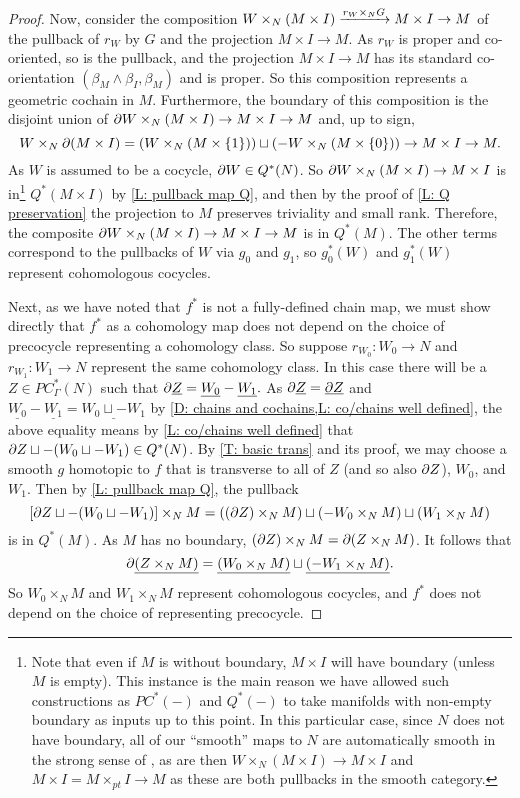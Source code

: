 \begin{proof}
	Now, consider the composition $W \times_N (M \times I) \xrightarrow{r_W \times_N G} M \times I \to M$ of the pullback of $r_W$ by $G$ and the projection $M \times I \to M$.
	As $r_W$ is proper and co-oriented, so is the pullback, and the projection $M \times I \to M$ has its standard co-orientation $(\beta_M \wedge \beta_I,\beta_M)$ and is proper.
	So this composition represents a geometric cochain in $M$.
	Furthermore, the boundary of this composition is the disjoint union of $\partial W \times_N (M \times I) \to M \times I \to M$ and, up to sign, $$W \times_N \partial(M \times I) = \left( W \times_N (M \times \{1\})\right) \sqcup \left(- W \times_N (M \times \{0\})\right) \to M \times I \to M.$$ 
	As $W$ is assumed to be a cocycle, $\partial W \in Q^*(N)$.
	So $\partial W \times_N (M \times I) \to M \times I$ is in\footnote{Note that even if $M$ is without boundary, $M \times I$ will have boundary (unless $M$ is empty).
		This instance is the main reason we have allowed such constructions as $PC^*(-)$ and $Q^*(-)$ to take manifolds with non-empty boundary as inputs up to this point.
		In this particular case, since $N$ does not have boundary, all of our ``smooth'' maps to $N$ are automatically smooth in the strong sense of \cite{Joy12}, as are then $W \times_N (M \times I) \to M \times I$ and $M \times I = M \times_{pt} I \to M$ as these are both pullbacks in the smooth category.} 
	$Q^*(M \times I)$ by \cref{L: pullback map Q}, and then by the proof of \cref{L: Q preservation} the projection to $M$ preserves triviality and small rank. 
	Therefore, the composite $\partial W \times_N (M \times I) \to M \times I \to M$ is in $Q^*(M)$. 
	The other terms correspond to the pullbacks of $W$ via $g_0$ and $g_1$, so $g_0^*(W)$ and $g_1^*(W)$ represent cohomologous cocycles.

	Next, as we have noted that $f^*$ is not a fully-defined chain map, we must show directly that $f^*$ as a cohomology map does not depend on the choice of precocycle representing a cohomology class.
	So suppose $r_{W_0} \colon W_0 \to N$ and $r_{W_1} \colon W_1 \to N$ represent the same cohomology class.
	In this case there will be a $Z \in PC^*_\Gamma(N)$ such that $\partial \underline{Z} = \underline{W_0} - \underline{W_1}.$
	As $\partial \underline{Z} = \underline{\partial Z}$ and $\underline{W_0} - \underline{W_1} = \underline{W_0 \sqcup - W_1}$ by \cref{D: chains and cochains,L: co/chains well defined}, the above equality means by \cref{L: co/chains well defined} that $\partial Z \sqcup -(W_0 \sqcup -W_1) \in Q^*(N)$. 
	By \cref{T: basic trans} and its proof, we may choose a smooth $g$ homotopic to $f$ that is transverse to all of $Z$ (and so also $\partial Z$), $W_0$, and $W_1$.
	Then by \cref{L: pullback map Q}, the pullback 
	$$\left[\partial Z \sqcup -(W_0 \sqcup -W_1)\right] \times_N M = ((\partial Z) \times_N M) \sqcup (-W_0 \times_N M) \sqcup (W_1 \times_N M)$$
	is in $Q^*(M)$. 
	As $M$ has no boundary, $(\partial Z) \times_N M = \partial (Z \times_N M)$.
	It follows that $$\partial \underline{(Z \times_N M)} = \underline{(W_0 \times_N M)} \sqcup \underline{(-W_1 \times_N M)}.$$
	So $W_0 \times_N M$ and $W_1 \times_N M$ represent cohomologous cocycles, and $f^*$ does not depend on the choice of representing precocycle. 


\end{proof}
